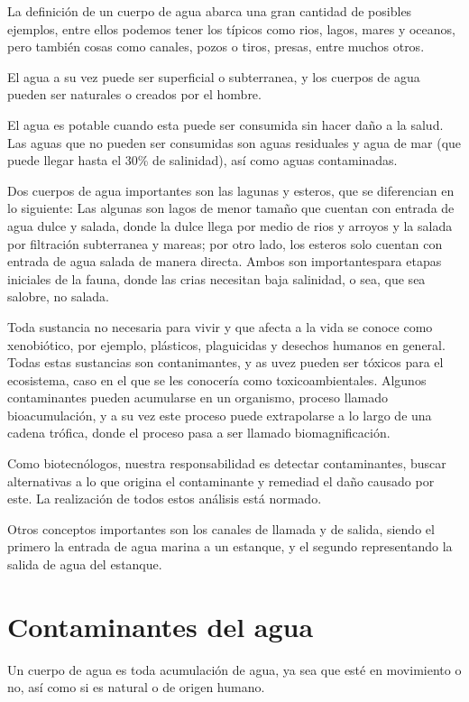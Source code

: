 
La definición de un cuerpo de agua abarca una gran cantidad de posibles ejemplos, entre ellos podemos tener los típicos como rios, lagos, mares y oceanos, pero también cosas como canales, pozos o tiros, presas, entre muchos otros.

El agua a su vez puede ser superficial o subterranea, y los cuerpos de agua pueden ser naturales o creados por el hombre.

El agua es potable cuando esta puede ser consumida sin hacer daño a la salud. Las aguas que no pueden ser consumidas son aguas residuales y agua de mar (que puede llegar hasta el 30\% de salinidad), así como aguas contaminadas.

Dos cuerpos de agua importantes son las lagunas y esteros, que se diferencian en lo siguiente: Las algunas son lagos de menor tamaño que cuentan con entrada de agua dulce y salada, donde la dulce llega por medio de rios y arroyos y la salada por filtración subterranea y mareas; por otro lado, los esteros solo cuentan con entrada de agua salada de manera directa.
Ambos son importantespara etapas iniciales de la fauna, donde las crias necesitan baja salinidad, o sea, que sea salobre, no salada.

Toda sustancia no necesaria para vivir y que afecta a la vida se conoce como xenobiótico, por ejemplo, plásticos, plaguicidas y desechos humanos en general. Todas estas sustancias son contanimantes, y as uvez pueden ser tóxicos para el ecosistema, caso en el que se les conocería como toxicoambientales. Algunos contaminantes pueden acumularse en un organismo, proceso llamado bioacumulación, y a su vez este proceso puede extrapolarse a lo largo de una cadena trófica, donde el proceso pasa a ser llamado biomagnificación.

Como biotecnólogos, nuestra responsabilidad es detectar contaminantes, buscar alternativas a lo que origina el contaminante y remediad el daño causado por este. La realización de todos estos análisis está normado.

Otros conceptos importantes son los canales de llamada y de salida, siendo el primero la entrada de agua marina a un estanque, y el segundo  representando la salida de agua del estanque.

\section{Contaminantes del agua}

Un cuerpo de agua es toda acumulación de agua, ya sea que esté en movimiento o no, así como si es natural o de origen humano.


